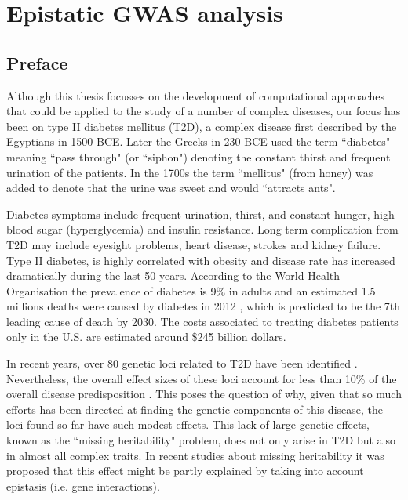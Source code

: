 
\chapter{Epistatic GWAS analysis\label{ch:gwas}}

\section{Preface}

Although this thesis focusses on the development of computational approaches that could be applied to the study of a number of complex diseases, our focus has been on type II diabetes mellitus (T2D), a complex disease first described by the Egyptians in 1500 BCE. Later the Greeks in 230 BCE used the term ``diabetes" meaning ``pass through" (or ``siphon") denoting the constant thirst and frequent urination of the patients. In the 1700s the term ``mellitus" (from honey) was added to denote that the urine was sweet and would ``attracts ants".

Diabetes symptoms include frequent urination, thirst, and constant hunger, high blood sugar (hyperglycemia) and insulin resistance. Long term complication from T2D may include eyesight problems, heart disease, strokes and kidney failure. Type II diabetes, is highly correlated with obesity and disease rate has increased dramatically during the last 50 years. According to the World Health Organisation the prevalence of diabetes is 9\% in adults and an estimated 1.5 millions deaths were caused by diabetes in 2012 \cite{guariguata2014global}, which is predicted to be the 7th leading cause of death by 2030. The costs associated to treating diabetes patients only in the U.S. are estimated around \$245 billion dollars.

In recent years, over 80 genetic loci related to T2D have been identified \cite{morris2012large, consortium2014genome}. Nevertheless, the overall effect sizes of these loci account for less than 10\% of the overall disease predisposition \cite{manolio2009finding}. This poses the question of why, given that so much efforts has been directed at finding the genetic components of this disease, the loci found so far have such modest effects. This lack of large genetic effects, known as the ``missing heritability" problem, does not only arise in T2D but also in almost all complex traits. In recent studies about missing heritability \cite{zuk2012mystery, zuk2014searching} it was proposed that this effect might be partly explained by taking into account epistasis (i.e. gene interactions).

